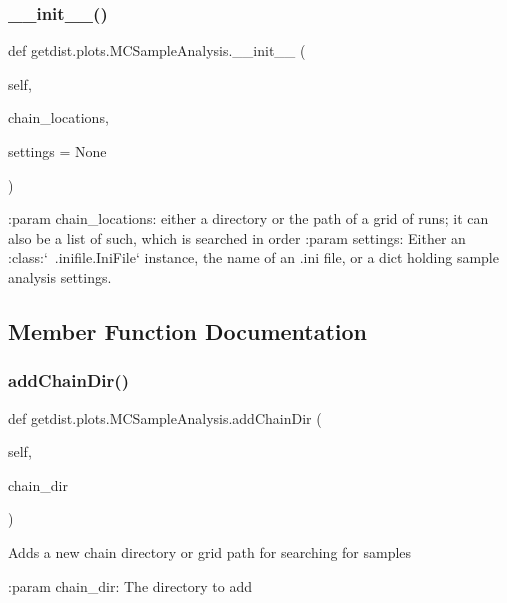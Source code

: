 \subsubsection{\texorpdfstring{\+\_\+\+\_\+init\+\_\+\+\_\+()}{\_\_init\_\_()}}
{\footnotesize\ttfamily def getdist.\+plots.\+M\+C\+Sample\+Analysis.\+\_\+\+\_\+init\+\_\+\+\_\+ (\begin{DoxyParamCaption}\item[{}]{self,  }\item[{}]{chain\+\_\+locations,  }\item[{}]{settings = {\ttfamily None} }\end{DoxyParamCaption})}

\begin{DoxyVerb}:param chain_locations: either a directory or the path of a grid of runs;
       it can also be a list of such, which is searched in order
:param settings: Either an :class:`~.inifile.IniFile` instance, 
       the name of an .ini file, or a dict holding sample analysis settings.
\end{DoxyVerb}
 

\subsection{Member Function Documentation}
\mbox{\label{classgetdist_1_1plots_1_1MCSampleAnalysis_aa2dc5aeed2c014c5ffee3dfc92850ae9}} 
\subsubsection{\texorpdfstring{add\+Chain\+Dir()}{addChainDir()}}
{\footnotesize\ttfamily def getdist.\+plots.\+M\+C\+Sample\+Analysis.\+add\+Chain\+Dir (\begin{DoxyParamCaption}\item[{}]{self,  }\item[{}]{chain\+\_\+dir }\end{DoxyParamCaption})}

\begin{DoxyVerb}Adds a new chain directory or grid path for searching for samples

:param chain_dir: The directory to add
\end{DoxyVerb}
 

